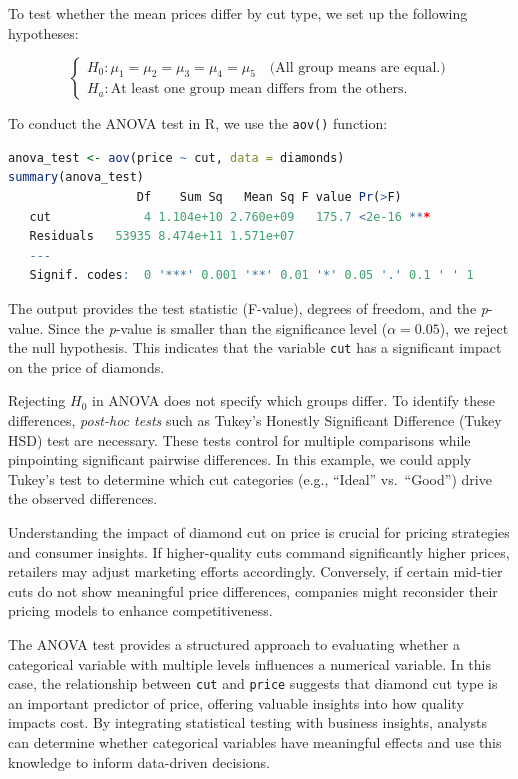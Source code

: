 \documentclass[
  11pt,
]{book}
\newcommand{\passthrough}[1]{#1}
\theoremstyle{definition}
\theoremstyle{definition}
\theoremstyle{definition}
\theoremstyle{definition}
\theoremstyle{remark}
\begin{document}
To test whether the mean prices differ by cut type, we set up the following hypotheses:

\[
\begin{cases}
    H_0: \mu_1 = \mu_2 = \mu_3 = \mu_4 = \mu_5 \quad \text{(All group means are equal.)} \\
    H_a: \text{At least one group mean differs from the others.}  
\end{cases}
\]

To conduct the ANOVA test in R, we use the \passthrough{\lstinline!aov()!} function:

\begin{lstlisting}[language=R]
anova_test <- aov(price ~ cut, data = diamonds)
summary(anova_test)
                  Df    Sum Sq   Mean Sq F value Pr(>F)    
   cut             4 1.104e+10 2.760e+09   175.7 <2e-16 ***
   Residuals   53935 8.474e+11 1.571e+07                   
   ---
   Signif. codes:  0 '***' 0.001 '**' 0.01 '*' 0.05 '.' 0.1 ' ' 1
\end{lstlisting}

The output provides the test statistic (F-value), degrees of freedom, and the \emph{p}-value. Since the \emph{p}-value is smaller than the significance level (\(\alpha = 0.05\)), we reject the null hypothesis. This indicates that the variable \passthrough{\lstinline!cut!} has a significant impact on the price of diamonds.

Rejecting \(H_0\) in ANOVA does not specify which groups differ. To identify these differences, \emph{post-hoc tests} such as Tukey's Honestly Significant Difference (Tukey HSD) test are necessary. These tests control for multiple comparisons while pinpointing significant pairwise differences. In this example, we could apply Tukey's test to determine which cut categories (e.g., ``Ideal'' vs.~``Good'') drive the observed differences.

Understanding the impact of diamond cut on price is crucial for pricing strategies and consumer insights. If higher-quality cuts command significantly higher prices, retailers may adjust marketing efforts accordingly. Conversely, if certain mid-tier cuts do not show meaningful price differences, companies might reconsider their pricing models to enhance competitiveness.

The ANOVA test provides a structured approach to evaluating whether a categorical variable with multiple levels influences a numerical variable. In this case, the relationship between \passthrough{\lstinline!cut!} and \passthrough{\lstinline!price!} suggests that diamond cut type is an important predictor of price, offering valuable insights into how quality impacts cost. By integrating statistical testing with business insights, analysts can determine whether categorical variables have meaningful effects and use this knowledge to inform data-driven decisions.
\end{document}
